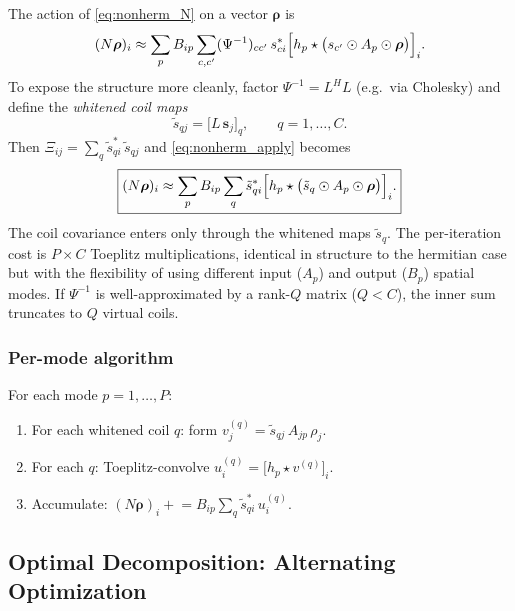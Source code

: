 \documentclass{article}
\begin{document}
The action of \eqref{eq:nonherm_N} on a vector $\boldsymbol{\rho}$ is
\begin{equation}
    (N\boldsymbol{\rho})_i
    \approx
    \sum_p B_{ip}
    \sum_{c,c'} (\Psi^{-1})_{cc'}\,s^*_{ci}
    \Bigl[h_p \star \bigl(s_{c'} \odot A_p \odot \boldsymbol{\rho}\bigr)\Bigr]_i.
    \label{eq:nonherm_apply}
\end{equation}
To expose the structure more cleanly, factor $\Psi^{-1} = L^H L$ (e.g.\ via Cholesky) and define the
\emph{whitened coil maps}
\begin{equation}
    \tilde{s}_{qj} = \bigl[L\,\mathbf{s}_j\bigr]_q, \qquad q = 1,\dots,C.
\end{equation}
Then $\Xi_{ij} = \sum_q \tilde{s}^*_{qi}\,\tilde{s}_{qj}$ and \eqref{eq:nonherm_apply} becomes
\begin{equation}
    \boxed{
    (N\boldsymbol{\rho})_i
    \approx
    \sum_p B_{ip}
    \sum_q \tilde{s}^*_{qi}
    \Bigl[h_p \star \bigl(\tilde{s}_q \odot A_p \odot \boldsymbol{\rho}\bigr)\Bigr]_i.
    }
    \label{eq:nonherm_apply_whitened}
\end{equation}
The coil covariance enters only through the whitened maps $\tilde{s}_q$.
The per-iteration cost is $P \times C$ Toeplitz multiplications, identical in structure to the hermitian
case but with the flexibility of using different input ($A_p$) and output ($B_p$) spatial modes.
If $\Psi^{-1}$ is well-approximated by a rank-$Q$ matrix ($Q < C$), the inner sum
truncates to $Q$ virtual coils.

\subsubsection*{Per-mode algorithm}

For each mode $p = 1,\dots,P$:
\begin{enumerate}[label=\arabic*.]
    \item For each whitened coil $q$: form $v^{(q)}_j = \tilde{s}_{qj}\,A_{jp}\,\rho_j$.
    \item For each $q$: Toeplitz-convolve $u^{(q)}_i = \bigl[h_p \star v^{(q)}\bigr]_i$.
    \item Accumulate: $(N\boldsymbol{\rho})_i \mathrel{+}= B_{ip}\sum_q \tilde{s}^*_{qi}\,u^{(q)}_i$.
\end{enumerate}

\subsection{Optimal Decomposition: Alternating Optimization}
\label{sec:als}
\end{document}

